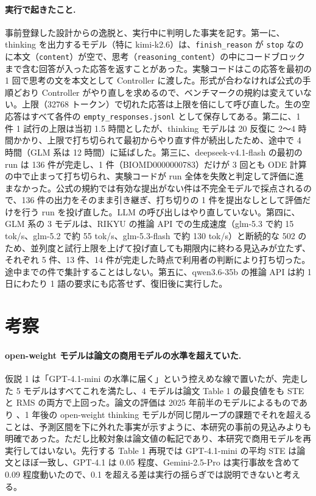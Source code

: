 \documentclass{article}
\begin{document}
\paragraph{実行で起きたこと.}
事前登録した設計からの逸脱と、実行中に判明した事実を記す。第一に、thinking を出力するモデル（特に kimi-k2.6）は、\texttt{finish\_reason} が \texttt{stop} なのに本文（\texttt{content}）が空で、思考（\texttt{reasoning\_content}）の中にコードブロックまで含む回答が入った応答を返すことがあった。実験コードはこの応答を最初の 1 回で思考の文を本文として Controller に渡した。形式が合わなければ公式の手順どおり Controller がやり直しを求めるので、ベンチマークの規約は変えていない。上限（32768 トークン）で切れた応答は上限を倍にして呼び直した。生の空応答はすべて各件の \texttt{empty\_responses.jsonl} として保存してある。第二に、1 件 1 試行の上限は当初 1.5 時間としたが、thinking モデルは 20 反復に 2〜4 時間かかり、上限で打ち切られて最初からやり直す件が続出したため、途中で 4 時間（GLM 系は 12 時間）に延ばした。第三に、deepseek-v4.1-flash の最初の run は 136 件が完走し、1 件（BIOMD0000000783）だけが 3 回とも ODE 計算の中で止まって打ち切られ、実験コードが run 全体を失敗と判定して評価に進まなかった。公式の規約では有効な提出がない件は不完全モデルで採点されるので、136 件の出力をそのまま引き継ぎ、打ち切りの 1 件を提出なしとして評価だけを行う run を投げ直した。LLM の呼び出しはやり直していない。第四に、GLM 系の 3 モデルは、RIKYU の推論 API での生成速度（glm-5.3 で約 15 tok/s、glm-5.2 で約 55 tok/s、glm-5.3-flash で約 130 tok/s）と断続的な 502 のため、並列度と試行上限を上げて投げ直しても期限内に終わる見込みが立たず、それぞれ 5 件、13 件、14 件が完走した時点で利用者の判断により打ち切った。途中までの件で集計することはしない。第五に、qwen3.6-35b の推論 API は約 1 日にわたり 1 語の要求にも応答せず、復旧後に実行した。

\section{考察}
\label{sec:discussion}
\paragraph{open-weight モデルは論文の商用モデルの水準を超えていた.}
仮説 1 は「GPT-4.1-mini の水準に届く」という控えめな線で置いたが、完走した 5 モデルはすべてこれを満たし、4 モデルは論文 Table 1 の最良値をも STE と RMS の両方で上回った。論文の評価は 2025 年前半のモデルによるものであり \cite[s1.p1]{duan-2025-measuring}、1 年後の open-weight thinking モデルが同じ閉ループの課題でそれを超えることは、予測区間を下に外れた事実が示すように、本研究の事前の見込みよりも明確であった。ただし比較対象は論文値の転記であり、本研究で商用モデルを再実行してはいない。先行する Table 1 再現では GPT-4.1-mini の平均 STE は論文とほぼ一致し、GPT-4.1 は 0.05 程度、Gemini-2.5-Pro は実行事故を含めて 0.09 程度動いたので、0.1 を超える差は実行の揺らぎでは説明できないと考える。
\end{document}
